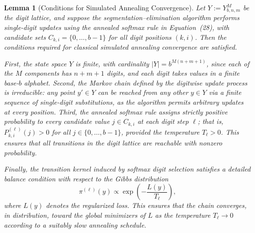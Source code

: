 \documentclass[aps,twocolumn,superscriptaddress,nofootinbib]{revtex4}
\newtheorem{lemma}{Lemma}
\begin{document}
\begin{lemma}[Conditions for Simulated Annealing Convergence]
\label{lemma:annealing_conditions}
Let \( Y := Y_{b,n,m}^M \) be the digit lattice, and suppose the segmentation--elimination algorithm performs single-digit updates using the annealed softmax rule in Equation~(28), with candidate sets \( C_{k,i} = \{0, \dots, b-1\} \) for all digit positions \( (k,i) \). Then the conditions required for classical simulated annealing convergence are satisfied.

First, the state space \( Y \) is finite, with cardinality \( |Y| = b^{M(n+m+1)} \), since each of the \( M \) components has \( n + m + 1 \) digits, and each digit takes values in a finite base-\( b \) alphabet. Second, the Markov chain defined by the digitwise update process is irreducible: any point \( y' \in Y \) can be reached from any other \( y \in Y \) via a finite sequence of single-digit substitutions, as the algorithm permits arbitrary updates at every position. Third, the annealed softmax rule assigns strictly positive probability to every candidate value \( j \in C_{k,i} \) at each digit step \( \ell \); that is, \( P^{(\ell)}_{k,i}(j) > 0 \) for all \( j \in \{0, \dots, b-1\} \), provided the temperature \( T_\ell > 0 \). This ensures that all transitions in the digit lattice are reachable with nonzero probability.

Finally, the transition kernel induced by softmax digit selection satisfies a detailed balance condition with respect to the Gibbs distribution
\begin{equation}
\pi^{(\ell)}(y) \propto \exp\left( -\frac{L(y)}{T_\ell} \right), \label{eq:gibb_dist}
\end{equation}
where \( L(y) \) denotes the regularized loss. This ensures that the chain converges, in distribution, toward the global minimizers of \( L \) as the temperature \( T_\ell \to 0 \) according to a suitably slow annealing schedule.
\end{lemma}
\end{document}
